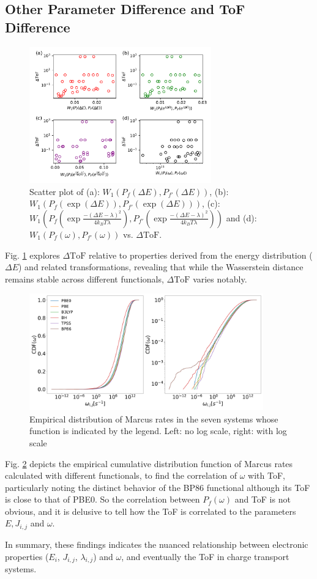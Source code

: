 \documentclass[letterpaper,12pt]{article}
\begin{document}
\subsection{Other Parameter Difference and ToF Difference}
\begin{figure}
    \centering
    \includegraphics[width=0.7\textwidth]{figs/DeltaToF_W_all.pdf}
    \caption{Scatter plot of (a): $W_1(P_f(\Delta E),P_{f'}(\Delta E))$, (b): $W_1(P_f(\exp(\Delta E)),P_{f'}(\exp(\Delta E)))$, (c): $W_1(P_f(\exp \frac{-(\Delta E - \lambda)^2}{4 k_B T \lambda}),P_{f'}(\exp \frac{-(\Delta E - \lambda)^2}{4 k_B T \lambda}))$ and (d): $W_1 (P_f(\omega), P_{f'}(\omega) )$ vs. $\Delta \text{ToF}$.   }
    \label{fig:d_WD_tof}
\end{figure}
Fig. \ref{fig:d_WD_tof} explores $\Delta \text{ToF}$ relative to properties derived from the energy distribution ($\Delta E$) and related transformations, revealing that while the Wasserstein distance remains stable across different functionals, $\Delta \text{ToF}$ varies notably.

\begin{figure}
    \centering
    \includegraphics[width=0.9\textwidth]{figs/cdf_w_log.pdf}
    \caption{Empirical distribution of Marcus rates in the seven systems whose function is indicated by the legend. Left: no log scale, right: with log scale}
    \label{fig:cdf_w}
\end{figure}
Fig. \ref{fig:cdf_w} depicts the empirical cumulative distribution function of Marcus rates calculated with different functionals, to find the correlation of $\omega$ with ToF, particularly noting the distinct behavior of the BP86 functional although its ToF is close to that of PBE0. 
So the correlation between $P_f(\omega)$ and ToF is not obvious, and it is delusive to tell how the ToF is correlated to the parameters $E,J_{i,j}$ and $\omega$.

In summary, these findings indicates the nuanced relationship between electronic properties ($E_i$, $J_{i,j}$, $\lambda_{i,j}$) and $\omega$, and eventually the ToF in  charge transport systems. 



\end{document}
